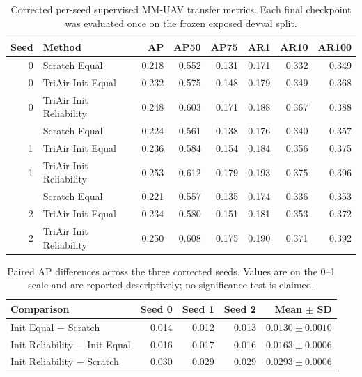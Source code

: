 \begin{table}[t]
\centering
\caption{Corrected per-seed supervised MM-UAV transfer metrics. Each final checkpoint was evaluated once on the frozen exposed devval split.}
\label{tab:mmuav-transfer-seeds}
\scriptsize
\setlength{\tabcolsep}{3.4pt}
\begin{tabular}{@{}rlrrrrrr@{}}
\toprule
Seed & Method & AP & AP50 & AP75 & AR1 & AR10 & AR100\\
\midrule
0 & Scratch Equal & 0.218 & 0.552 & 0.131 & 0.171 & 0.332 & 0.349\\
0 & TriAir Init Equal & 0.232 & 0.575 & 0.148 & 0.179 & 0.349 & 0.368\\
0 & TriAir Init Reliability & 0.248 & 0.603 & 0.171 & 0.188 & 0.367 & 0.388\\
\addlinespace
1 & Scratch Equal & 0.224 & 0.561 & 0.138 & 0.176 & 0.340 & 0.357\\
1 & TriAir Init Equal & 0.236 & 0.584 & 0.154 & 0.184 & 0.356 & 0.375\\
1 & TriAir Init Reliability & 0.253 & 0.612 & 0.179 & 0.193 & 0.375 & 0.396\\
\addlinespace
2 & Scratch Equal & 0.221 & 0.557 & 0.135 & 0.174 & 0.336 & 0.353\\
2 & TriAir Init Equal & 0.234 & 0.580 & 0.151 & 0.181 & 0.353 & 0.372\\
2 & TriAir Init Reliability & 0.250 & 0.608 & 0.175 & 0.190 & 0.371 & 0.392\\
\bottomrule
\end{tabular}
\end{table}

\begin{table}[t]
\centering
\caption{Paired AP differences across the three corrected seeds. Values are on the 0--1 scale and are reported descriptively; no significance test is claimed.}
\label{tab:mmuav-paired-ap}
\scriptsize
\setlength{\tabcolsep}{3.2pt}
\begin{tabular}{@{}lrrrr@{}}
\toprule
Comparison & Seed 0 & Seed 1 & Seed 2 & Mean $\pm$ SD\\
\midrule
Init Equal $-$ Scratch & 0.014 & 0.012 & 0.013 & $0.0130\pm0.0010$\\
Init Reliability $-$ Init Equal & 0.016 & 0.017 & 0.016 & $0.0163\pm0.0006$\\
Init Reliability $-$ Scratch & 0.030 & 0.029 & 0.029 & $0.0293\pm0.0006$\\
\bottomrule
\end{tabular}
\end{table}

